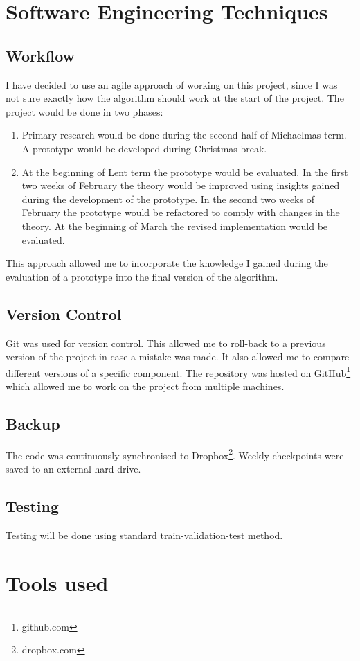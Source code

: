 \documentclass[12pt,a4paper]{book}
\begin{document}
\section{Software Engineering Techniques}
\subsection{Workflow}
I have decided to use an agile approach of working on this project, since I was not sure exactly how the algorithm should work at the start of the project.
The project would be done in two phases:
\begin{enumerate}
\item Primary research would be done during the second half of Michaelmas term.
A prototype would be developed during Christmas break.
\item At the beginning of Lent term the prototype would be evaluated.
In the first two weeks of February the theory would be improved using insights gained during the development of the prototype.
In the second two weeks of February the prototype would be refactored to comply with changes in the theory.
At the beginning of March the revised implementation would be evaluated.
\end{enumerate}
This approach allowed me to incorporate the knowledge I gained during the evaluation of a prototype into the final version of the algorithm.
\subsection{Version Control}
Git was used for version control.
This allowed me to roll-back to a previous version of the project in case a mistake was made.
It also allowed me to compare different versions of a specific component.
The repository was hosted on GitHub\footnote{github.com} which allowed me to work on the project from multiple machines.
\subsection{Backup}
The code was continuously synchronised to Dropbox\footnote{dropbox.com}.
Weekly checkpoints were saved to an external hard drive.
\subsection{Testing}
Testing will be done using standard train-validation-test method.
\section{Tools used}
\end{document}
